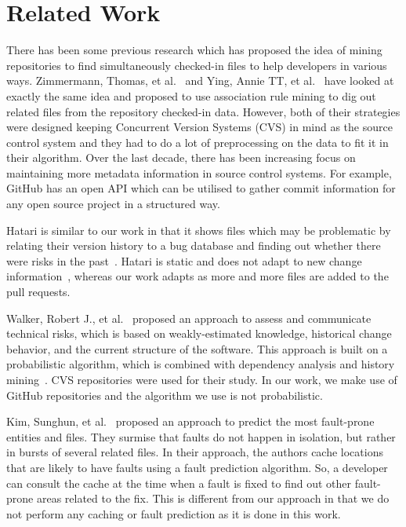 
\section{Related Work}
\label{sec:related}

There has been some previous research which has proposed the idea of mining repositories to find simultaneously checked-in files to help developers in various ways. Zimmermann, Thomas, et al.~\cite{zimmermann2005mining} and Ying, Annie TT, et al.~\cite{ying2004predicting} have looked at exactly the same idea and proposed to use association rule mining to dig out related files from the repository checked-in data. However, both of their strategies were designed keeping Concurrent Version Systems (CVS) in mind as the source control system and they had to do a lot of preprocessing on the data to fit it in their algorithm. Over the last decade, there has been increasing focus on maintaining more metadata information in source control systems. For example, GitHub has an open API which can be utilised to gather commit information for any open source project in a structured way.

Hatari is similar to our work in that it shows files which may be problematic by relating their version history to a bug database and finding out whether there were risks in the past~\cite{sliwerski2005hatari}. Hatari is static and does not adapt to new change information~\cite{kim2007predicting}, whereas our work adapts as more and more files are added to the pull requests.

Walker, Robert J., et al.~\cite{walker2006lightweight} proposed an approach to assess and communicate technical risks, which is based on weakly-estimated knowledge, historical change behavior, and the current structure of the software. This approach is built on a probabilistic algorithm, which is combined with dependency analysis and history mining~\cite{lehnert2011review}. CVS repositories were used for their study. In our work, we make use of GitHub repositories and the algorithm we use is not probabilistic.

Kim, Sunghun, et al.~\cite{kim2007predicting} proposed an approach to predict the most fault-prone entities and files. They surmise that faults do not happen in isolation, but rather in bursts of several related files. In their approach, the authors cache locations that are likely to have faults using a fault prediction algorithm. So, a developer can consult the cache at the time when a fault is fixed to find out other fault-prone areas related to the fix. This is different from our approach in that we do not perform any caching or fault prediction as it is done in this work.

